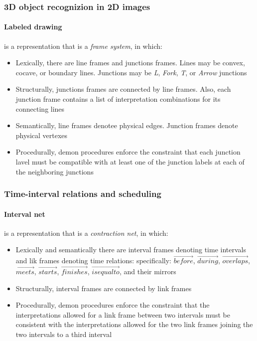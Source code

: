 \subsubsection{3D object recognizion in 2D images}

\paragraph{Labeled drawing} is a representation that is a \textit{frame
system}, in which:
\begin{itemize}
  \item Lexically, there are line frames and junctions frames.
    Lines may be convex, cocave, or boundary lines. Junctions may
    be \textit{L}, \textit{Fork}, \textit{T}, or \textit{Arrow}
    junctions
  \item Structurally, junctions frames are connected by line
    frames. Also, each junction frame contains a list of
    interpretation combinations for its connecting lines
  \item Semantically, line frames denotee physical edges.
    Junction frames denote physical vertexes
  \item Procedurally, demon procedures enforce the constraint
    that each junction lavel must be compatible with at least one
    of the junction labels at each of the neighboring junctions
\end{itemize}

\subsubsection{Time-interval relations and scheduling}

\paragraph{Interval net} is a representation that is a
\textit{contraction net}, in which:
\begin{itemize}
  \item Lexically and semantically there are interval frames
    denoting time intervals and lik frames denoting time
    relations: specifically: $\overrightarrow{before}$,
    $\overrightarrow{during}$, $\overrightarrow{overlaps}$,
    $\overrightarrow{meets}$, $\overrightarrow{starts}$,
    $\overrightarrow{finishes}$, $\overrightarrow{is equal to}$,
    and their mirrors
  \item Structurally, interval frames are connected by link
    frames
  \item Procedurally, demon procedures enforce the constraint
    that the interpretations allowed for a link frame between two
    intervals must be consistent with the interpretations allowed
    for the two link frames joining the two intervals to a third
    interval
\end{itemize}

